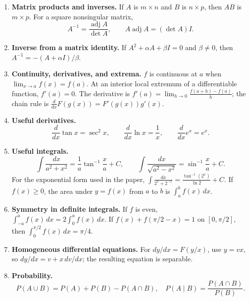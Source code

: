 \begin{enumerate}[label=\normalfont 2.1.\arabic*.,ref=2.1.\arabic*]
\setlength{\itemsep}{0.35em}
\item \label{formula-2-1-1} \textbf{Matrix products and inverses.} If $A$ is $m\times n$ and $B$ is $n\times p$, then $AB$ is $m\times p$. For a square nonsingular matrix,
\begin{equation*}\tag{2.1.1.1}
A^{-1}=\frac{\operatorname{adj}A}{\det A},\qquad A\operatorname{adj}A=(\det A)I.
\end{equation*}
\item \label{formula-2-1-2} \textbf{Inverse from a matrix identity.} If $A^2+\alpha A+\beta I=0$ and $\beta\ne0$, then $A^{-1}=-(A+\alpha I)/\beta$.
\item \label{formula-2-1-3} \textbf{Continuity, derivatives, and extrema.} $f$ is continuous at $a$ when $\lim_{x\to a}f(x)=f(a)$. At an interior local extremum of a differentiable function, $f\prime(a)=0$. The derivative is $f'(a)=\lim_{h\to0}\frac{f(a+h)-f(a)}h$; the chain rule is $\frac{d}{dx}F(g(x))=F'(g(x))g'(x)$.
\item \label{formula-2-1-4} \textbf{Useful derivatives.}
\begin{equation*}\tag{2.1.4.1}
\frac{d}{dx}\tan x=\sec^2x,\qquad
\frac{d}{dx}\ln x=\frac1x,\qquad
\frac{d}{dx}e^x=e^x.
\end{equation*}
\item \label{formula-2-1-5} \textbf{Useful integrals.}
\begin{equation*}\tag{2.1.5.1}
\int\frac{dx}{a^2+x^2}=\frac1a\tan^{-1}\!\frac xa+C,\qquad
\int\frac{dx}{\sqrt{a^2-x^2}}=\sin^{-1}\!\frac xa+C.
\end{equation*}
For the exponential form used in the paper, $\int\frac{dx}{2^x+2^{-x}}=\frac{\tan^{-1}(2^x)}{\ln2}+C$. If $f(x)\ge0$, the area under $y=f(x)$ from $a$ to $b$ is $\int_a^b f(x)\,dx$.
\item \label{formula-2-1-6} \textbf{Symmetry in definite integrals.} If $f$ is even, $\int_{-a}^{a}f(x)\,dx=2\int_0^a f(x)\,dx$. If $f(x)+f(\pi/2-x)=1$ on $[0,\pi/2]$, then $\int_0^{\pi/2}f(x)\,dx=\pi/4$.
\item \label{formula-2-1-7} \textbf{Homogeneous differential equations.} For $dy/dx=F(y/x)$, use $y=vx$, so $dy/dx=v+x\,dv/dx$; the resulting equation is separable.
\item \label{formula-2-1-8} \textbf{Probability.}
\begin{equation*}\tag{2.1.8.1}
P(A\cup B)=P(A)+P(B)-P(A\cap B),\quad
P(A\mid B)=\frac{P(A\cap B)}{P(B)}.

\end{equation*}
\end{enumerate}

